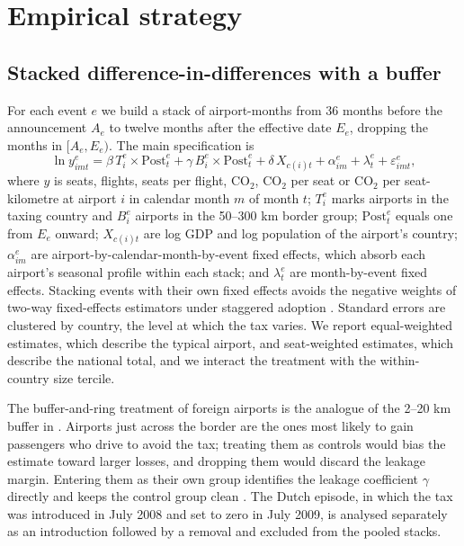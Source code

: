 \section{Empirical strategy}
\label{sec:strategy}

\subsection{Stacked difference-in-differences with a buffer}

For each event $e$ we build a stack of airport-months from 36 months before the announcement $A_e$ to
twelve months after the effective date $E_e$, dropping the months in $[A_e, E_e)$. The main
specification is
\begin{equation}
\ln y_{imt}^{e} = \beta\, T_i^{e} \times \text{Post}_t^{e} + \gamma\, B_i^{e} \times \text{Post}_t^{e}
 + \delta\, X_{c(i)t} + \alpha_{i m}^{e} + \lambda_{t}^{e} + \varepsilon_{imt}^{e},
\label{eq:did}
\end{equation}
where $y$ is seats, flights, seats per flight, CO$_2$, CO$_2$ per seat or CO$_2$ per seat-kilometre at
airport $i$ in calendar month $m$ of month $t$; $T_i^e$ marks airports in the taxing country and
$B_i^e$ airports in the 50--300 km border group; $\text{Post}_t^e$ equals one from $E_e$ onward;
$X_{c(i)t}$ are log GDP and log population of the airport's country; $\alpha_{im}^e$ are airport-by-calendar-month-by-event fixed effects, which absorb each airport's seasonal profile within each stack; and
$\lambda_t^e$ are month-by-event fixed effects. Stacking events with their own fixed effects avoids the
negative weights of two-way fixed-effects estimators under staggered adoption \citep{cengiz2019,goodmanbacon2021}.
Standard errors are clustered by country, the level at which the tax varies. We report equal-weighted
estimates, which describe the typical airport, and seat-weighted estimates, which describe the national
total, and we interact the treatment with the within-country size tercile.

The buffer-and-ring treatment of foreign airports is the analogue of the 2--20 km buffer in
\citet{li2019subway}. Airports just across the border are the ones most likely to gain passengers who
drive to avoid the tax; treating them as controls would bias the estimate toward larger losses, and
dropping them would discard the leakage margin. Entering them as their own group identifies the leakage
coefficient $\gamma$ directly and keeps the control group clean \citep{butts2023}. The Dutch episode,
in which the tax was introduced in July 2008 and set to zero in July 2009, is analysed separately as an
introduction followed by a removal and excluded from the pooled stacks.

